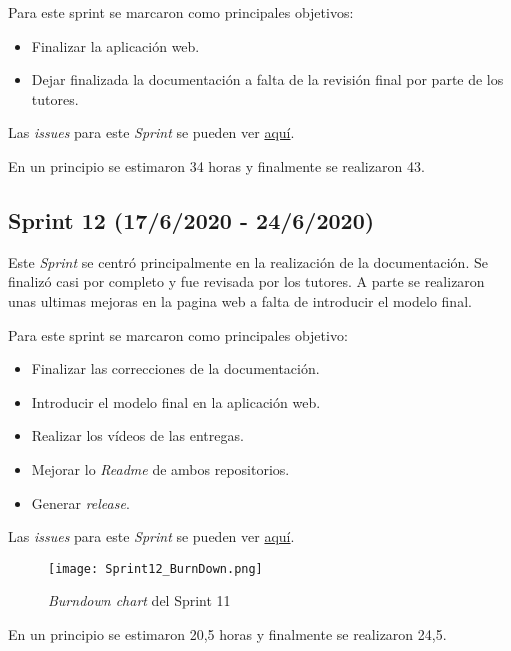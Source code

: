 Para este sprint se marcaron como principales objetivos:
\begin{itemize}
	\item Finalizar la aplicación web.
	\item Dejar finalizada la documentación a falta de la revisión final por parte de los tutores.
\end{itemize} 

Las \emph{issues} para este \emph{Sprint} se pueden ver \href{https://github.com/psnti/TFG-Pablo-Santidrian-Tudanca/milestone/11}{aquí}.


En un principio se estimaron 34 horas y finalmente se realizaron 43.

\subsection{Sprint 12 (17/6/2020 - 24/6/2020)}\label{Sprint-11}

Este \emph{Sprint} se centró principalmente en la realización de la documentación. Se finalizó casi por completo y fue revisada por los tutores. A parte se realizaron unas ultimas mejoras en la pagina web a falta de introducir el modelo final.

Para este sprint se marcaron como principales objetivo:
\begin{itemize}
	\item Finalizar las correcciones de la documentación.
	\item Introducir el modelo final en la aplicación web.
	\item Realizar los vídeos de las entregas.
	\item Mejorar lo \emph{Readme} de ambos repositorios.
	\item Generar \emph{release}.
\end{itemize} 

Las \emph{issues} para este \emph{Sprint} se pueden ver \href{https://github.com/psnti/TFG-Pablo-Santidrian-Tudanca/milestone/12}{aquí}.

\begin{figure}[!h]
	\centering
	\texttt{[image: Sprint12\_BurnDown.png]}
	\caption{\textit{Burndown chart} del Sprint 11}\label{}
\end{figure}


En un principio se estimaron 20,5 horas y finalmente se realizaron 24,5.

